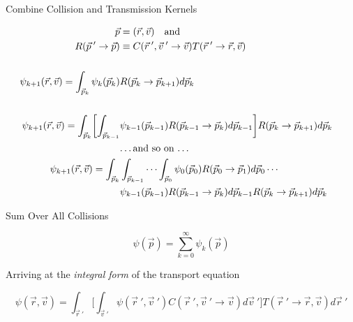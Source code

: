 \documentclass[xcolor=x11names,compress, handout]{beamer}
\renewcommand{\(}{\begin{columns}}
\renewcommand{\)}{\end{columns}}
\newcommand{\<}[1]{\begin{column}{#1}}
\renewcommand{\>}{\end{column}}
\begin{document}
\begin{frame}{Combine Collision and Transmission Kernels}

\begin{align*}
\vec{p} &= (\vec{r}, \vec{v}) \quad \text{and}\\
%
R(\vec{p}\:'\rightarrow\vec{p}) &\equiv C(\vec{r}\:', \vec{v}\:' \rightarrow \vec{v}) T(\vec{r}\:' \rightarrow \vec{r}, \vec{v}) \\
&\\
%
\psi_{k+1}(\vec{r}, \vec{v}) = \int_{\vec{p}_k} \psi_k(\vec{p}_k) &R(\vec{p}_k \rightarrow \vec{p}_{k+1}) d\vec{p}_k \\
%
&\\
\psi_{k+1}(\vec{r}, \vec{v}) = \int_{\vec{p}_k} \biggl[ \int_{\vec{p}_{k-1}}  &\psi_{k-1}(\vec{p}_{k-1}) R(\vec{p}_{k-1} \rightarrow \vec{p}_{k}) d\vec{p}_{k-1} \biggr] R(\vec{p}_k \rightarrow \vec{p}_{k+1}) d\vec{p}_k \\
&\text{\dots and so on \dots}
&\\
\psi_{k+1}(\vec{r}, \vec{v}) = \int_{\vec{p}_k} &\int_{\vec{p}_{k-1}} \cdots \int_{\vec{p}_0} \psi_{0}(\vec{p}_{0}) R(\vec{p}_{0} \rightarrow \vec{p}_{1}) d\vec{p}_{0} \cdots \\
&\psi_{k-1}(\vec{p}_{k-1}) R(\vec{p}_{k-1} \rightarrow \vec{p}_{k}) d\vec{p}_{k-1} R(\vec{p}_k \rightarrow \vec{p}_{k+1}) d\vec{p}_k \\
\end{align*}

\end{frame}


\begin{frame}{Sum Over All Collisions}

\[\psi(\vec{p}) = \sum_{k=0}^{\infty} \psi_k(\vec{p})\]

\vspace*{1 em}
Arriving at the \textit{integral form} of the transport equation

\[\psi(\vec{r}, \vec{v}) = \int_{\vec{r}\:'} \biggl[ \int_{\vec{v}\:'} \psi(\vec{r}\:', \vec{v}\:') C(\vec{r}\:', \vec{v}\:' \rightarrow \vec{v})  d\vec{v}\:'\biggr] T(\vec{r}\:' \rightarrow \vec{r}, \vec{v}) d\vec{r}\:'\]

\end{frame}
\end{document}
